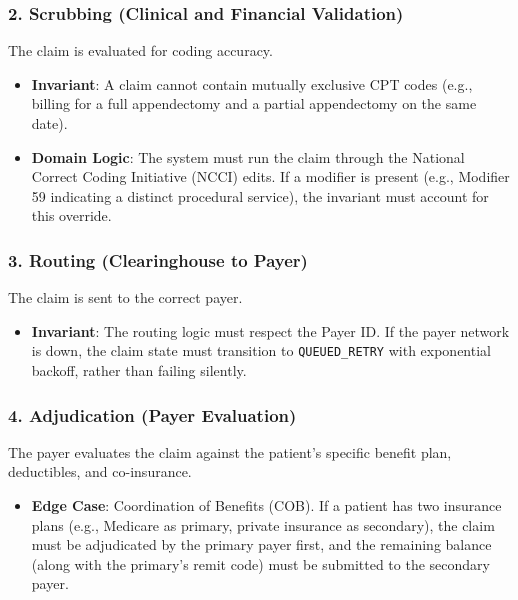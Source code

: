 \documentclass[
  11pt,
  openany,
  oneside]{book}
\providecommand{\tightlist}{%
  \setlength{\itemsep}{0pt}\setlength{\parskip}{0pt}}
\begin{document}
\subsubsection{2. Scrubbing (Clinical and Financial
Validation)}\label{scrubbing-clinical-and-financial-validation}

The claim is evaluated for coding accuracy.

\begin{itemize}
\tightlist
\item
  \textbf{Invariant}: A claim cannot contain mutually exclusive CPT
  codes (e.g., billing for a full appendectomy and a partial
  appendectomy on the same date).
\item
  \textbf{Domain Logic}: The system must run the claim through the
  National Correct Coding Initiative (NCCI) edits. If a modifier is
  present (e.g., Modifier 59 indicating a distinct procedural service),
  the invariant must account for this override.
\end{itemize}

\subsubsection{3. Routing (Clearinghouse to
Payer)}\label{routing-clearinghouse-to-payer}

The claim is sent to the correct payer.

\begin{itemize}
\tightlist
\item
  \textbf{Invariant}: The routing logic must respect the Payer ID. If
  the payer network is down, the claim state must transition to
  \texttt{QUEUED\_RETRY} with exponential backoff, rather than failing
  silently.
\end{itemize}

\subsubsection{4. Adjudication (Payer
Evaluation)}\label{adjudication-payer-evaluation}

The payer evaluates the claim against the patient's specific benefit
plan, deductibles, and co-insurance.

\begin{itemize}
\tightlist
\item
  \textbf{Edge Case}: Coordination of Benefits (COB). If a patient has
  two insurance plans (e.g., Medicare as primary, private insurance as
  secondary), the claim must be adjudicated by the primary payer first,
  and the remaining balance (along with the primary's remit code) must
  be submitted to the secondary payer.
\end{itemize}
\end{document}

